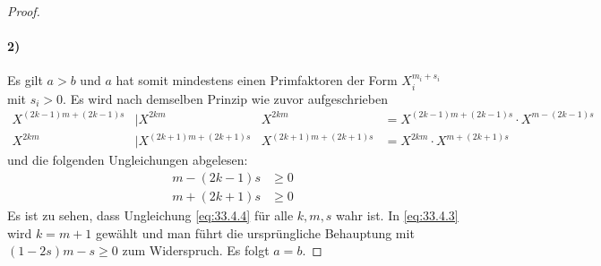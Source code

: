 \begin{proof}
  \paragraph{2)}
  Es gilt $a > b$ und $a$ hat somit mindestens einen Primfaktoren
  der Form $X_i^{m_i + s_i}$ mit $s_i > 0$. Es wird nach demselben Prinzip wie zuvor aufgeschrieben
  \begin{align*}
    X^{(2k - 1)m + (2k -1)s} & \mid X^{2km}                   & X^{2km}                   & = X^{(2k - 1)m + (2k -1)s} \cdot X^{m - (2k - 1)s} \\
    X^{2km}                  & \mid X^{(2k + 1)m + (2k + 1)s} & X^{(2k + 1)m + (2k + 1)s} & = X^{2km} \cdot X^{m + (2k + 1)s}
  \end{align*}
  und die folgenden Ungleichungen abgelesen:
  \begin{align}
    \label{eq:33.4.3}
    m - (2k - 1)s & \geq 0 \\
    \label{eq:33.4.4}
    m + (2k + 1)s & \geq 0
  \end{align}
  Es ist zu sehen, dass Ungleichung \ref{eq:33.4.4} für alle $k,m,s$ wahr ist. In \ref{eq:33.4.3}
  wird $k = m + 1$ gewählt und man führt die ursprüngliche Behauptung
  mit $(1 - 2s)m - s \geq 0$ zum Widerspruch. Es folgt $a = b$.
\end{proof}